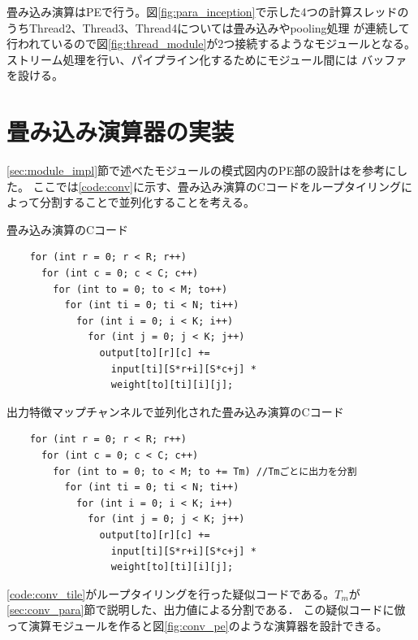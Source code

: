 {畳み込み演算はPEで行う。図\ref{fig:para_inception}で示した4つの計算スレッドのうちThread2、Thread3、Thread4については畳み込みやpooling処理
が連続して行われているので図\ref{fig:thread_module}が2つ接続するようなモジュールとなる。ストリーム処理を行い、パイプライン化するためにモジュール間には
バッファを設ける。

\section{畳み込み演算器の実装}
\label{sec:conv_impl}
\ref{sec:module_impl}節で述べたモジュールの模式図内のPE部の設計は\cite{optimized}を参考にした。
ここでは\ref{code:conv}に示す、畳み込み演算のCコードをループタイリングによって分割することで並列化することを考える。

\begin{itembox}[1]{畳み込み演算のCコード}
    \label{code:conv}
    \begin{verbatim}
    for (int r = 0; r < R; r++)
      for (int c = 0; c < C; c++)
        for (int to = 0; to < M; to++)
          for (int ti = 0; ti < N; ti++)
            for (int i = 0; i < K; i++)
              for (int j = 0; j < K; j++)
                output[to][r][c] +=
                  input[ti][S*r+i][S*c+j] *
                  weight[to][ti][i][j];
    \end{verbatim}
\end{itembox}

\begin{itembox}[1]{出力特徴マップチャンネルで並列化された畳み込み演算のCコード}
    \label{code:conv_tile}
    \begin{verbatim}
    for (int r = 0; r < R; r++)
      for (int c = 0; c < C; c++)
        for (int to = 0; to < M; to += Tm) //Tmごとに出力を分割
          for (int ti = 0; ti < N; ti++)
            for (int i = 0; i < K; i++)
              for (int j = 0; j < K; j++)
                output[to][r][c] +=
                  input[ti][S*r+i][S*c+j] *
                  weight[to][ti][i][j];
    \end{verbatim}
\end{itembox}

\ref{code:conv_tile}がループタイリングを行った疑似コードである。$T_m$が\ref{sec:conv_para}節で説明した、出力値による分割である．
この疑似コードに倣って演算モジュールを作ると図\ref{fig:conv_pe}のような演算器を設計できる。

}

